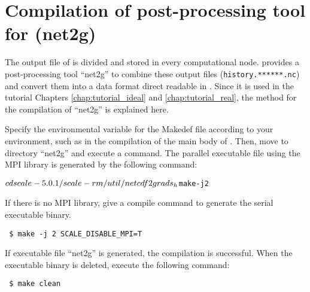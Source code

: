 \section{Compilation of post-processing tool for \scalerm (net2g)} \label{sec:source_net2g}

The output file of \scalerm is divided and stored in every computational node.
\scalelib provides a post-processing tool ``net2g''  to combine these output files
(\verb|history.******.nc|)
and convert them into a data format direct readable in \grads.
Since it is used in the tutorial Chapters \ref{chap:tutorial_ideal} and \ref{chap:tutorial_real}, the method for the compilation of ``net2g'' is explained here.

Specify the environmental variable for the Makedef file according to your environment,
such as in the compilation of the main body of \scalelib. Then, move to directory  ``net2g'' and execute a command. The parallel executable file using the MPI library is generated by the following command:
\begin{alltt}
 $ cd scale-{\version}/scale-rm/util/netcdf2grads_h
 $ make -j 2
\end{alltt}
If there is no MPI library,
give a compile command to generate the serial executable binary.
\begin{verbatim}
 $ make -j 2 SCALE_DISABLE_MPI=T
\end{verbatim}
If executable file ``net2g'' is generated, the compilation is successful.
When the executable binary is deleted, execute the following command:
\begin{verbatim}
 $ make clean
\end{verbatim}


